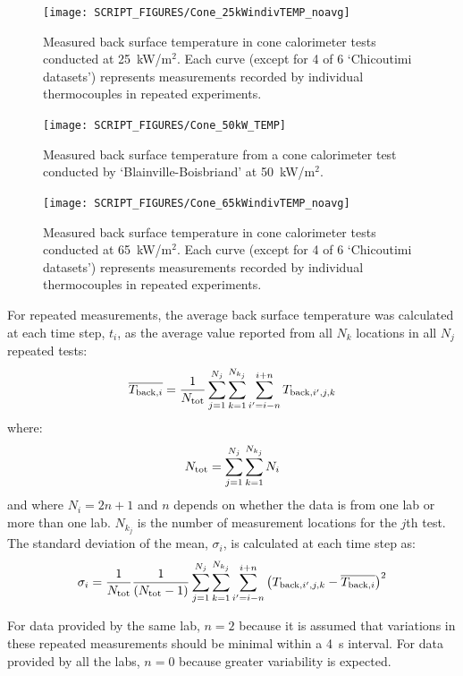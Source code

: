 \documentclass{book}
\begin{document}
\begin{figure}[p]
  \centering
  \texttt{[image: SCRIPT\_FIGURES/Cone\_25kWindivTEMP\_noavg]}
  \caption{Measured back surface temperature in cone calorimeter tests conducted at 25~kW/m$^2$. Each curve (except for 4 of 6 ‘Chicoutimi datasets’) represents measurements recorded by individual thermocouples in repeated experiments.}
  \label{Fig:Cone_25kWindivTEMP}
\end{figure}

\begin{figure}
  \centering
  \texttt{[image: SCRIPT\_FIGURES/Cone\_50kW\_TEMP]}
  \caption{Measured back surface temperature from a cone calorimeter test conducted by ‘Blainville-Boisbriand’ at 50~kW/m$^2$.}
  \label{Fig:Cone_50kWindivTEMP}
\end{figure}

\begin{figure}
  \centering
  \texttt{[image: SCRIPT\_FIGURES/Cone\_65kWindivTEMP\_noavg]}
  \caption{Measured back surface temperature in cone calorimeter tests conducted at 65~kW/m$^2$. Each curve (except for 4 of 6 ‘Chicoutimi datasets’) represents measurements recorded by individual thermocouples in repeated experiments.}
  \label{Fig:Cone_65kWindivTEMP}
\end{figure}


For repeated measurements, the average back surface temperature was calculated at each time step, $t_i$, as the average value reported from all $N_k$ locations in all $N_j$ repeated tests:
\begin{equation}
  \overline{ T_{{\rm back},i} } = \frac{1}{N_{\rm tot}} \sum_{j=1}^{N_j} \sum_{k=1}^{N_{k_j}} \sum_{i'=i-n}^{i+n} T_{{\rm back},i',j,k} 
\end{equation}
where:
\begin{equation}
N_{\rm tot}={\sum_{j=1}^{N_j}\sum_{k=1}^{N_{k_j}}N_i}
\end{equation}
and where $N_i=2n+1$ and $n$ depends on whether the data is from one lab or more than one lab. $N_{k_j}$ is the number of measurement locations for the $j$th test. The standard deviation of the mean, $\sigma_i$, is calculated at each time step as:
\begin{equation}
   \sigma_i = \frac{1}{N_{\rm tot}} \frac{1}{(N_{\rm tot}-1)}
    \sum_{j=1}^{N_j} \sum_{k=1}^{N_{k_j}} \sum_{i'=i-n}^{i+n} \left( T_{{\rm back},i',j,k} - \overline{ T_{{\rm back},i} }  \right)^2
\end{equation}


For data provided by the same lab, $n=2$ because it is assumed that variations in these repeated measurements should be minimal within a 4~s interval. For data provided by all the labs, $n=0$ because greater variability is expected.
\end{document}
